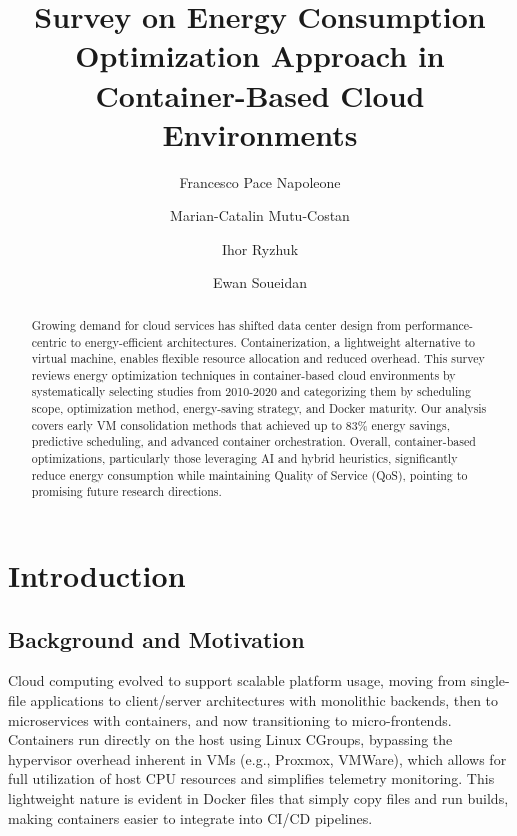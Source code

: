 \documentclass[runningheads]{llncs}
\begin{document}
\title{Survey on Energy Consumption Optimization Approach in Container-Based Cloud Environments}


\author{Francesco Pace Napoleone \and
Marian-Catalin Mutu-Costan \and
Ihor Ryzhuk \and
Ewan Soueidan}



\maketitle
%
\begin{abstract}

Growing demand for cloud services has shifted data center design from performance-centric to energy-efficient architectures. Containerization, a lightweight alternative to virtual machine, enables flexible resource allocation and reduced overhead. This survey reviews energy optimization techniques in container-based cloud environments by systematically selecting studies from 2010-2020 and categorizing them by scheduling scope, optimization method, energy-saving strategy, and Docker maturity. Our analysis covers early VM consolidation methods that achieved up to 83\% energy savings, predictive scheduling, and advanced container orchestration. Overall, container-based optimizations, particularly those leveraging AI and hybrid heuristics, significantly reduce energy consumption while maintaining Quality of Service (QoS), pointing to promising future research directions.

\end{abstract}

\section{Introduction}

\subsection{Background and Motivation}
Cloud computing evolved to support scalable platform usage, moving from single-file applications to client/server 
architectures with monolithic backends, then to microservices with containers, and now transitioning to micro-frontends. 
Containers run directly on the host using Linux CGroups, bypassing the hypervisor overhead inherent in VMs (e.g., 
Proxmox, VMWare), which allows for full utilization of host CPU resources and simplifies telemetry monitoring. 
This lightweight nature is evident in Docker files that simply copy files and run builds, making containers easier to integrate 
into CI/CD pipelines.
\end{document}
